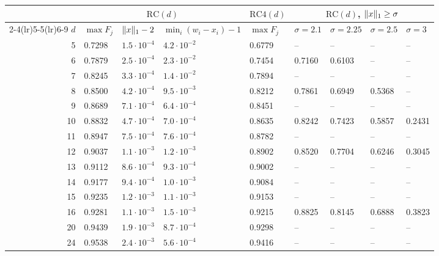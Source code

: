 \begin{tabular}{r l l l l l l l l}
\toprule
& \multicolumn{3}{c}{$\mathrm{RC}(d)$} & $\mathrm{RC4}(d)$ & \multicolumn{4}{c}{$\mathrm{RC}(d)$, $\lVert x\rVert_1\ge\sigma$} \\
\cmidrule(lr){2-4}\cmidrule(lr){5-5}\cmidrule(lr){6-9}
$d$ & $\max F_j$ & $\lVert x\rVert_1-2$ & $\min_i(w_i-x_i)-1$ & $\max F_j$ & $\sigma=2.1$ & $\sigma=2.25$ & $\sigma=2.5$ & $\sigma=3$ \\
\midrule
5 & 0.7298 & $1.5\cdot10^{-4}$ & $4.2\cdot10^{-2}$ & 0.6779 & -- & -- & -- & -- \\
6 & 0.7879 & $2.5\cdot10^{-4}$ & $2.3\cdot10^{-2}$ & 0.7454 & 0.7160 & 0.6103 & -- & -- \\
7 & 0.8245 & $3.3\cdot10^{-4}$ & $1.4\cdot10^{-2}$ & 0.7894 & -- & -- & -- & -- \\
8 & 0.8500 & $4.2\cdot10^{-4}$ & $9.5\cdot10^{-3}$ & 0.8212 & 0.7861 & 0.6949 & 0.5368 & -- \\
9 & 0.8689 & $7.1\cdot10^{-4}$ & $6.4\cdot10^{-4}$ & 0.8451 & -- & -- & -- & -- \\
10 & 0.8832 & $4.7\cdot10^{-4}$ & $7.0\cdot10^{-4}$ & 0.8635 & 0.8242 & 0.7423 & 0.5857 & 0.2431 \\
11 & 0.8947 & $7.5\cdot10^{-4}$ & $7.6\cdot10^{-4}$ & 0.8782 & -- & -- & -- & -- \\
12 & 0.9037 & $1.1\cdot10^{-3}$ & $1.2\cdot10^{-3}$ & 0.8902 & 0.8520 & 0.7704 & 0.6246 & 0.3045 \\
13 & 0.9112 & $8.6\cdot10^{-4}$ & $9.3\cdot10^{-4}$ & 0.9002 & -- & -- & -- & -- \\
14 & 0.9177 & $9.4\cdot10^{-4}$ & $1.0\cdot10^{-3}$ & 0.9084 & -- & -- & -- & -- \\
15 & 0.9235 & $1.2\cdot10^{-3}$ & $1.1\cdot10^{-3}$ & 0.9153 & -- & -- & -- & -- \\
16 & 0.9281 & $1.1\cdot10^{-3}$ & $1.5\cdot10^{-3}$ & 0.9215 & 0.8825 & 0.8145 & 0.6888 & 0.3823 \\
20 & 0.9439 & $1.9\cdot10^{-3}$ & $8.7\cdot10^{-4}$ & 0.9298 & -- & -- & -- & -- \\
24 & 0.9538 & $2.4\cdot10^{-3}$ & $5.6\cdot10^{-4}$ & 0.9416 & -- & -- & -- & -- \\
\bottomrule
\end{tabular}
